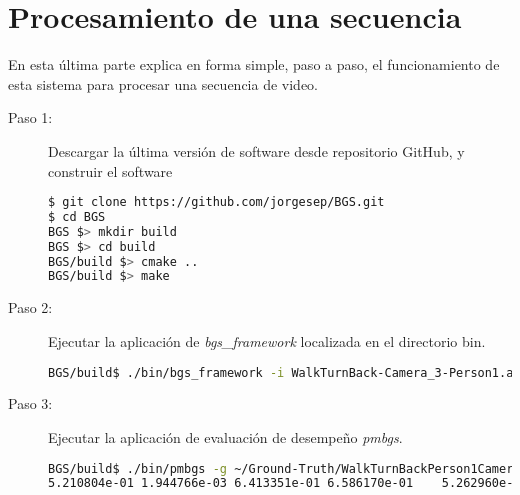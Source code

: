 
\chapter{Procesamiento de una secuencia}
En esta última parte explica en forma simple, paso a paso, el funcionamiento de esta sistema para procesar una secuencia de video.

\begin{description}
\item[Paso 1:] Descargar la última versión de software desde repositorio GitHub, y construir el software

\begin{lstlisting}[language=bash]
$ git clone https://github.com/jorgesep/BGS.git
$ cd BGS
BGS $> mkdir build
BGS $> cd build
BGS/build $> cmake ..
BGS/build $> make
\end{lstlisting}
\normalsize
\item[Paso 2:] Ejecutar la aplicación de \textit{bgs\_framework} localizada en el directorio bin.
\begin{lstlisting}[language=bash]
BGS/build$ ./bin/bgs_framework -i WalkTurnBack-Camera_3-Person1.avi
\end{lstlisting}
\normalsize
\item[Paso 3:] Ejecutar la aplicación de evaluación de desempeño \textit{pmbgs}.
\begin{lstlisting}[language=bash]
BGS/build$ ./bin/pmbgs -g ~/Ground-Truth/WalkTurnBackPerson1Camera3 -i mog2_mask/0
5.210804e-01 1.944766e-03 6.413351e-01 6.586170e-01    5.262960e-01 1.828969e-03 6.508549e-01 6.636832e-01     467/467
\end{lstlisting}
\normalsize
\end{description} 


